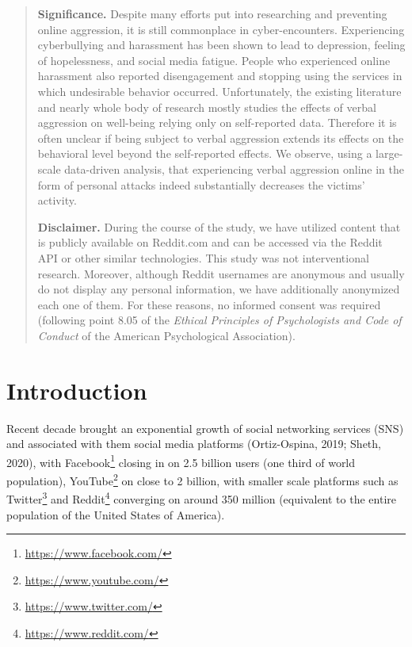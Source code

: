 \documentclass[
  10pt,
  dvipsnames]{scrartcl}
\begin{document}
\begin{abstract}
\noindent \textbf{Significance.} Despite many efforts put into researching and preventing online aggression, it is still commonplace in cyber-encounters. Experiencing cyberbullying and harassment has been shown to lead to depression, feeling of hopelessness, and social media fatigue. People who experienced online harassment also reported disengagement and stopping using the services in which undesirable behavior occurred. Unfortunately, the existing literature and nearly whole body of research mostly studies the effects of verbal aggression on well-being relying only on self-reported data. Therefore it is often unclear if being subject to verbal aggression extends its effects on the behavioral level beyond the self-reported effects. We observe,  using a large-scale data-driven analysis, that experiencing verbal aggression online in the form of personal attacks indeed substantially decreases the victims’ activity.

\vspace{2mm}


\noindent \textbf{Disclaimer.} During the course of the study, we have utilized content that is publicly available on \textsf{Reddit.com} and can be accessed via the \textsf{Reddit} API or other similar technologies. This study was not  interventional research. Moreover,  although Reddit usernames are anonymous and usually do not display any personal information, we have additionally anonymized each one of them.  For these reasons, no informed consent was required (following point 8.05 of the \emph{Ethical Principles of Psychologists and Code of Conduct} of the American Psychological Association).
\normalsize

\thispagestyle{empty}

\end{abstract}

\section{Introduction}
\label{intro}

Recent decade brought an exponential growth of social networking
services (SNS) and associated with them social media platforms
(Ortiz-Ospina, 2019; Sheth, 2020), with
Facebook\footnote{\url{https://www.facebook.com/}} closing in on 2.5
billion users (one third of world population),
YouTube\footnote{\url{https://www.youtube.com/}} on close to 2 billion,
with smaller scale platforms such as
Twitter\footnote{\url{https://www.twitter.com/}} and
Reddit\footnote{\url{https://www.reddit.com/}} converging on around 350
million (equivalent to the entire population of the United States of
America).
\end{document}
